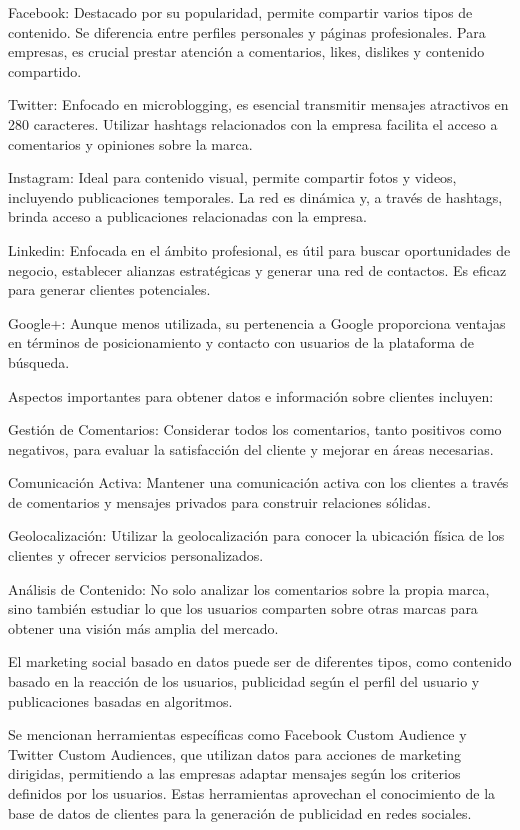 \documentclass[
    a4paper, %
    10pt, %
    unnumberedsections, %
    twoside, %
]{LTJournalArticle}
\begin{document}
Facebook: Destacado por su popularidad, permite compartir varios tipos de contenido. Se diferencia entre perfiles personales y páginas profesionales. Para empresas, es crucial prestar atención a comentarios, likes, dislikes y contenido compartido.

Twitter: Enfocado en microblogging, es esencial transmitir mensajes atractivos en 280 caracteres. Utilizar hashtags relacionados con la empresa facilita el acceso a comentarios y opiniones sobre la marca.

Instagram: Ideal para contenido visual, permite compartir fotos y videos, incluyendo publicaciones temporales. La red es dinámica y, a través de hashtags, brinda acceso a publicaciones relacionadas con la empresa.

Linkedin: Enfocada en el ámbito profesional, es útil para buscar oportunidades de negocio, establecer alianzas estratégicas y generar una red de contactos. Es eficaz para generar clientes potenciales.

Google+: Aunque menos utilizada, su pertenencia a Google proporciona ventajas en términos de posicionamiento y contacto con usuarios de la plataforma de búsqueda.

Aspectos importantes para obtener datos e información sobre clientes incluyen:

Gestión de Comentarios: Considerar todos los comentarios, tanto positivos como negativos, para evaluar la satisfacción del cliente y mejorar en áreas necesarias.

Comunicación Activa: Mantener una comunicación activa con los clientes a través de comentarios y mensajes privados para construir relaciones sólidas.

Geolocalización: Utilizar la geolocalización para conocer la ubicación física de los clientes y ofrecer servicios personalizados.

Análisis de Contenido: No solo analizar los comentarios sobre la propia marca, sino también estudiar lo que los usuarios comparten sobre otras marcas para obtener una visión más amplia del mercado.

El marketing social basado en datos puede ser de diferentes tipos, como contenido basado en la reacción de los usuarios, publicidad según el perfil del usuario y publicaciones basadas en algoritmos.

Se mencionan herramientas específicas como Facebook Custom Audience y Twitter Custom Audiences, que utilizan datos para acciones de marketing dirigidas, permitiendo a las empresas adaptar mensajes según los criterios definidos por los usuarios. Estas herramientas aprovechan el conocimiento de la base de datos de clientes para la generación de publicidad en redes sociales.
\end{document}
